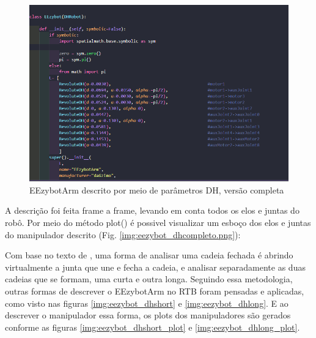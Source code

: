 \begin{figure}[!h]
		\caption{\label{img:dh.png}EEzybotArm descrito por meio de parâmetros DH, versão completa}
		\begin{center}
			\includegraphics[scale=0.6]{img/dh.png}
		\end{center}
	\end{figure}

A descrição foi feita frame a frame, levando em conta todos os elos e juntas do robô. Por meio do método plot() é possivel visualizar um esboço dos elos e juntas do manipulador descrito (Fig. \ref{img:eezybot_dhcompleto.png}):


Com base no texto de \cite{Siciliano2009}, uma forma de analisar uma cadeia fechada é abrindo virtualmente a junta que une e fecha a cadeia, e analisar separadamente as duas cadeias que se formam, uma curta e outra longa.  Seguindo essa metodologia, outras formas de descrever o EEzybotArm no RTB foram pensadas e aplicadas, como visto nas figuras \ref{img:eezybot_dhshort} e \ref{img:eezybot_dhlong}. E ao descrever o manipulador essa forma, os plots dos manipuladores são gerados conforme as figuras \ref{img:eezybot_dhshort_plot} e \ref{img:eezybot_dhlong_plot}.

